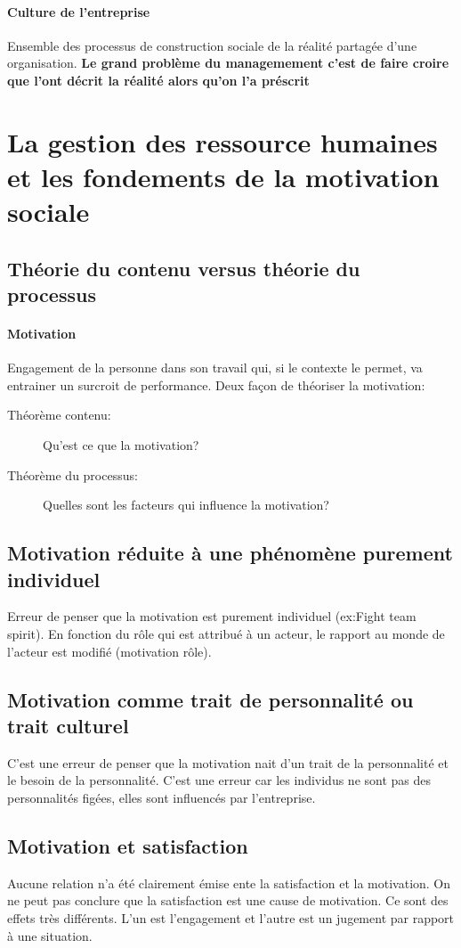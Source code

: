 \documentclass[11pt]{article} %
\begin{document}
		\paragraph{Culture de l'entreprise} Ensemble des processus de construction sociale de la réalité 
		partagée d'une organisation.
		\textbf{Le grand problème du managemement  c'est de faire croire que l'ont décrit la réalité alors 
		qu'on l'a préscrit}
\section{La gestion des ressource humaines et les fondements de la motivation sociale}
	\subsection{Théorie du contenu versus théorie du processus}
		\paragraph{Motivation} Engagement de la personne dans son travail qui, si le contexte le permet, va
		entrainer un surcroit de performance.
		Deux façon de théoriser la motivation:
		\begin{description}
			\item[Théorème contenu: ] Qu'est ce que la motivation?
			\item[Théorème du processus: ] Quelles sont les facteurs qui influence la motivation?
		\end{description}
	\subsection{Motivation réduite à une phénomène purement individuel}
		Erreur de penser que la motivation est purement individuel (ex:Fight team spirit). En fonction du
		rôle qui est attribué à un acteur, le rapport au monde de l'acteur est modifié (motivation rôle).
	\subsection{Motivation comme trait de personnalité ou trait culturel}
		C'est une erreur de penser que la motivation nait d'un trait de la personnalité et le besoin de la 
		personnalité. C'est une erreur car les individus ne sont pas des personnalités figées, elles sont 	
		influencés par l'entreprise.
	\subsection{Motivation et satisfaction}
		Aucune relation n'a été clairement émise ente la satisfaction et la motivation. On ne peut pas conclure 
		que la satisfaction est une cause de motivation. Ce sont des effets très différents. L'un est 
		l'engagement et l'autre est un jugement par rapport à une situation.
\end{document}
